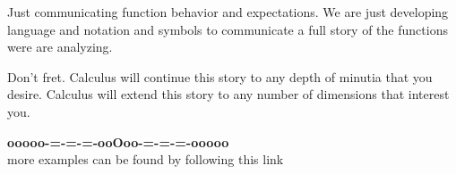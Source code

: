 \documentclass{ximera}
\begin{document}
Just communicating function behavior and expectations.  We are just developing language and notation and symbols to communicate a full story of the functions were are analyzing. 


Don't fret. Calculus will continue this story to any depth of minutia that you desire. Calculus will extend this story to any number of dimensions that interest you.











\begin{onlineOnly}
\begin{center}
\textbf{\textcolor{green!50!black}{ooooo-=-=-=-ooOoo-=-=-=-ooooo}} \\

more examples can be found by following this link\\ 

\end{center}
\end{onlineOnly}
\end{document}
